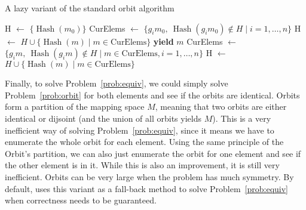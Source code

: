 \begin{algorithm}
	\caption{A lazy variant of the standard orbit algorithm}
	\label{algo:lazy_orbit}
	\begin{algorithmic}[1]
     \State H $\leftarrow$ $\{ \operatorname{Hash}(m_0) \}$
     \State CurElems $\leftarrow$ $\{ g_i m_0,~\operatorname{Hash}(g_i m_0) \notin H \mid i = 1,\ldots,n \}$
     \State H $\leftarrow$ $H \cup \{ \operatorname{Hash}(m) \mid m \in \text{CurElems} \}$
		         \State \textbf{yield }$m$
	     \EndFor 
     \State CurElems $\leftarrow$ $\{ g_i m,~\operatorname{Hash}(g_i m) \notin H \mid m \in \text{CurElems}, i = 1,\ldots,n \}$
     \State H $\leftarrow$ $H \cup \{ \operatorname{Hash}(m) \mid m \in \text{CurElems} \}$
   \EndWhile
	\end{algorithmic}
\end{algorithm}

Finally, to solve Problem~\ref{prob:equiv}, we could simply solve Problem~\ref{prob:orbit} for both elements and see if the orbits are identical.
Orbits form a partition of the mapping space $M$, meaning that two orbits are either identical or dijsoint (and the union of all orbits yields $M$).
This is a very inefficient way of solving Problem~\ref{prob:equiv}, since it means we have to enumerate the whole orbit for each element.
Using the same principle of the Orbit's partition, we can also just enumerate the orbit for one element and see if the other element is in it.
While this is also an improvement, it is still very inefficient. Orbits can be very large when the problem has much symmetry.
By default, \mpsym uses this variant as a fall-back method to solve Problem~\ref{prob:equiv} when correctness needs to be guaranteed.

